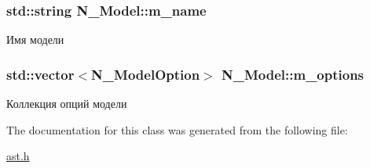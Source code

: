 \subsubsection[{m\+\_\+name}]{\setlength{\rightskip}{0pt plus 5cm}std\+::string N\+\_\+\+Model\+::m\+\_\+name\hspace{0.3cm}{\ttfamily [protected]}}\label{classN__Model_a9d9ab454862eb335a49140a4c80dcf6b}


Имя модели 

\hypertarget{classN__Model_a7ef79bbb67076275fc204313c112f548}{}
\subsubsection[{m\+\_\+options}]{\setlength{\rightskip}{0pt plus 5cm}std\+::vector$<${\bf N\+\_\+\+Model\+Option}$>$ N\+\_\+\+Model\+::m\+\_\+options\hspace{0.3cm}{\ttfamily [protected]}}\label{classN__Model_a7ef79bbb67076275fc204313c112f548}


Коллекция опций модели 



The documentation for this class was generated from the following file\+:\begin{DoxyCompactItemize}
\item 
\hyperlink{ast_8h}{ast.\+h}\end{DoxyCompactItemize}
